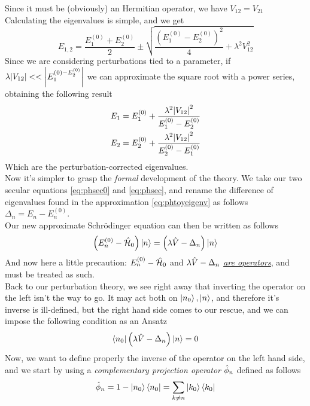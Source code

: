 \documentclass[../qm.tex]{subfiles}
\begin{document}
	Since it must be (obviously) an Hermitian operator, we have $V_{12}=V_{21}$
	Calculating the eigenvalues is simple, and we get
	\begin{equation}
		E_{1,2}=\frac{E_1^{(0)}+E_2^{(0)}}{2}\pm\sqrt{\frac{(E_1^{(0)}-E_2^{(0)})^2}{4}+\lambda^2V_{12}^2}
		\label{eq:eigenperthamtoy}
	\end{equation}
	Since we are considering perturbations tied to a parameter, if $\lambda\abs{V_{12}}<<\abs{E_1^{(0)-E_2^{(0)}}}$ we can approximate the square root with a power series, obtaining the following result
	\begin{equation}
		\begin{aligned}
			E_1&=E_1^{(0)}+\frac{\lambda^2\abs{V_{12}}^2}{E_1^{(0)}-E_2^{(0)}}\\
			E_2&=E_2^{(0)}+\frac{\lambda^2\abs{V_{12}}^2}{E_2^{(0)}-E_1^{(0)}}
		\end{aligned}
		\label{eq:phtoyeigenv}
	\end{equation}
	Which are the perturbation-corrected eigenvalues.\\
	Now it's simpler to grasp the \emph{formal} development of the theory. We take our two secular equations \eqref{eq:phsec0} and \eqref{eq:phsec}, and rename the difference of eigenvalues found in the approximation \eqref{eq:phtoyeigenv} as follows $\Delta_n=E_n-E_n^{(0)}$.\\
	Our new approximate Schrödinger equation can then be written as follows
	\begin{equation}
		\left( E_n^{(0)}-\hat{\mathcal{H}}_0 \right)\ket{n}=\left( \lambda\hat{V}-\Delta_n \right)\ket{n}
		\label{eq:formaldefschr}
	\end{equation}
	And now here a little precaution: $E_n^{(0)}-\hat{\mathcal{H}}_0$ and $\lambda\hat{V}-\Delta_n$ \underline{\emph{are operators}}, and must be treated as such.\\
	Back to our perturbation theory, we see right away that inverting the operator on the left isn't the way to go. It may act both on $\ket{n_0},\ket{n}$, and therefore it's inverse is ill-defined, but the right hand side comes to our rescue, and we can impose the following condition as an Ansatz
	\begin{equation}
		\bra{n_0}\left( \lambda\hat{V}-\Delta_n \right)\ket{n}=0
		\label{eq:rhsopcond}
	\end{equation}
	Now, we want to define properly the inverse of the operator on the left hand side, and we start by using a \textit{complementary projection operator} $\hat{\phi}_n$ defined as follows
	\begin{equation}
		\hat{\phi}_n=1-\ket{n_0}\bra{n_0}=\sum_{k\ne n}\ket{k_0}\bra{k_0}
		\label{eq:compprojop}
	\end{equation}
\end{document}
